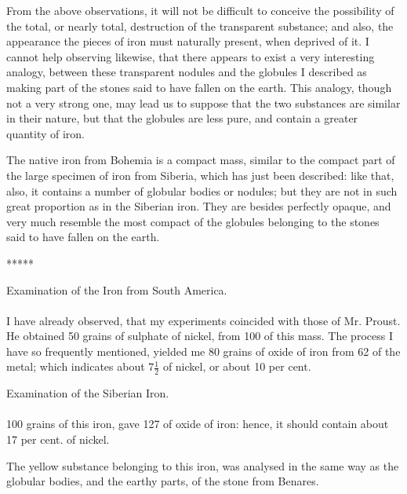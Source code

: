 \documentclass[a4paper, 12pt, oneside, twocolumn]{article}
\begin{document}
From the above observations, it will not be difficult to conceive the possibility of the total, or nearly total, destruction of the transparent substance; and also, the appearance the pieces of iron must naturally present, when deprived of it. I cannot help observing likewise, that there appears to exist a very interesting analogy, between these transparent nodules and the globules I described as making part of the stones said to have fallen on the earth. This analogy, though not a very strong one, may lead us to suppose that the two substances are similar in their nature, but that the globules are less pure, and contain a greater quantity of iron.

The native iron from Bohemia is a compact mass, similar to the compact part of the large specimen of iron from Siberia, which has just been described: like that, also, it contains a number of globular bodies or nodules; but they are not in such great proportion as in the Siberian iron. They are besides perfectly opaque, and very much resemble the most compact of the globules belonging to the stones said to have fallen on the earth.

\centerline{*\hspace{15mm}*\hspace{15mm}*\hspace{15mm}*\hspace{15mm}*}
\bigskip

\begin{center}
Examination of the Iron from South America.
\end{center}
\paragraph{}
I have already observed, that my experiments coincided with those of Mr. Proust. He obtained 50 grains of sulphate of nickel, from 100 of this mass. The process I have so frequently mentioned, yielded me 80 grains of oxide of iron from 62 of the metal; which indicates about $7\frac{1}{2}$ of nickel, or about 10 per cent.
\begin{center}
Examination of the Siberian Iron.
\end{center}
\paragraph{}
100 grains of this iron, gave 127 of oxide of iron: hence, it should contain about 17 per cent. of nickel.

The yellow substance belonging to this iron, was analysed in the same way as the globular bodies, and the earthy parts, of the stone from Benares.
\end{document}
